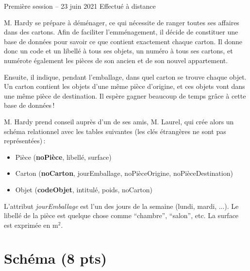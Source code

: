 %
{Première session -- 23 juin 2021}%
{Effectué à distance}%

M. Hardy se prépare à déménager, ce qui nécessite
de ranger toutes ses affaires dans des cartons.
Afin de faciliter l'emménagement, il décide de constituer
une base de données pour savoir ce que contient
exactement chaque carton. Il donne donc un code 
et un libellé à tous ses objets, un numéro à
tous ses cartons, et numérote également
les pièces de son ancien et de son nouvel appartement.

Ensuite, il indique, pendant l'emballage, dans quel
carton se trouve chaque objet. Un carton
contient les objets d'une même pièce d'origine, et
ces objets vont dans une même pièce de destination.
Il espère gagner beaucoup de temps grâce à cette base de données\,!

M. Hardy prend conseil auprès d'un de ses amis, M. Laurel, qui
crée alors un schéma relationnel avec les tables suivantes
(les clés étrangères ne sont pas représentées)\,:

      \begin{itemize}
        \item Pièce (\textbf{noPièce}, libellé, surface)
        \item Carton (\textbf{noCarton}, jourEmballage, noPièceOrigine, 
                            noPièceDestination)
        \item  Objet (\textbf{codeObjet}, intitulé, poids,
                     noCarton)
       \end{itemize}

L'attribut \textit{jourEmballage} est l'un
des jours de la semaine (lundi, mardi, ...). Le libellé
de la pièce est quelque chose comme ``chambre'', ``salon'',
etc. La surface est exprimée en m$^2$.

\section{Schéma (8 pts)}

